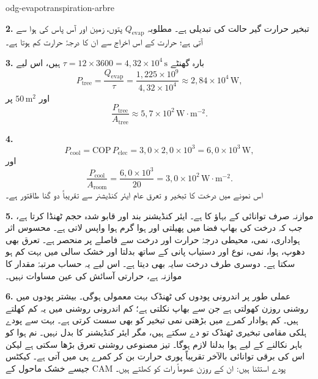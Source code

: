 \begin{exo}{odg-evapotranspiration-arbre}
\begin{solution}
\textbf{2.} تبخیر حرارت گیر حالت کی تبدیلی ہے۔ مطلوبہ $Q_{\mathrm{evap}}$ پتوں، زمین اور آس پاس کی ہوا سے آتی ہے؛ حرارت کے اس اخراج سے ان کا درجۂ حرارت کم ہوتا ہے۔

\textbf{3.} بارہ گھنٹے $\tau=12\times3600=4{,}32\times10^4\,\text{s}$ ہیں، اس لیے
\[
P_{\mathrm{tree}}=\frac{Q_{\mathrm{evap}}}{\tau}
=\frac{1{,}225\times10^9}{4{,}32\times10^4}
\approx2{,}84\times10^4\,\text{W},
\]
اور $50\,\text{m}^2$ پر
\[
\frac{P_{\mathrm{tree}}}{A_{\mathrm{tree}}}\approx5{,}7\times10^2\,\text{W}\!\cdot\!\text{m}^{-2}.
\]

\textbf{4.}
\[
P_{\mathrm{cool}}=\mathrm{COP}\,P_{\mathrm{elec}}=3{,}0\times2{,}0\times10^3=6{,}0\times10^3\,\text{W},
\]
اور
\[
\frac{P_{\mathrm{cool}}}{A_{\mathrm{room}}}=\frac{6{,}0\times10^3}{20}=3{,}0\times10^2\,\text{W}\!\cdot\!\text{m}^{-2}.
\]
اس نمونے میں درخت کا تبخیر و تعرق عام ایئر کنڈیشنر سے تقریباً دو گنا طاقتور ہے۔

\textbf{5.} موازنہ صرف توانائی کے بہاؤ کا ہے۔ ایئر کنڈیشنر بند اور قابو شدہ حجم ٹھنڈا کرتا ہے، جب کہ درخت کی بھاپ فضا میں پھیلتی اور ہوا گرم ہوا واپس لاتی ہے۔ محسوس اثر ہواداری، نمی، محیطی درجۂ حرارت اور درخت سے فاصلے پر منحصر ہے۔ تعرق بھی دھوپ، ہوا، نمی، نوع اور دستیاب پانی کے ساتھ بدلتا اور خشک سالی میں بہت کم ہو سکتا ہے۔ دوسری طرف درخت سایہ بھی دیتا ہے۔ اس لیے یہ حساب مرتبۂ مقدار کا موازنہ ہے، حرارتی آسائش کی عین مساوات نہیں۔

\textbf{6.} عملی طور پر اندرونی پودوں کی ٹھنڈک بہت معمولی ہوگی۔ بیشتر پودوں میں روشنی روزن کھولتی ہے جن سے بھاپ نکلتی ہے؛ کم اندرونی روشنی میں یہ کم کھلتے ہیں۔ کم ہوادار کمرے میں بڑھتی نمی تبخیر کو بھی سست کرتی ہے۔ بہت سے پودے ہلکی مقامی تبخیری ٹھنڈک تو دے سکتے ہیں، مگر ایئر کنڈیشنر کا بدل نہیں۔ نم ہوا کو باہر نکالنے کے لیے ہوا بدلنا لازم ہوگا۔ تیز مصنوعی روشنی تعرق بڑھا سکتی ہے لیکن اس کی برقی توانائی بالآخر تقریباً پوری حرارت بن کر کمرے ہی میں آتی ہے۔ کیکٹس جیسے خشک ماحول کے CAM پودے استثنا ہیں: ان کے روزن عموماً رات کو کھلتے ہیں۔
\end{solution}
\end{exo}

